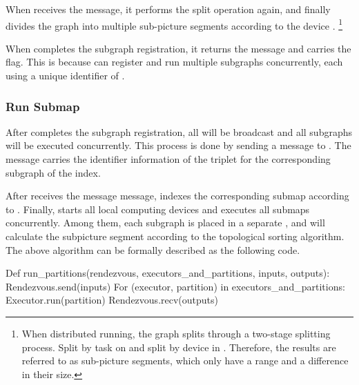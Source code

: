 \begin{content}
When  receives the  message, it performs the split operation again, and finally divides the graph into multiple sub-picture segments  according to the device . \footnote{When distributed running, the graph splits through a two-stage splitting process. Split by task on  and split by device in . Therefore, the results are referred to as sub-picture segments, which only have a range and a difference in their size. }

When  completes the subgraph registration, it returns the  message and carries the  flag. This is because  can register and run multiple subgraphs concurrently, each using a unique identifier of .

\subsubsection{Run Submap}

After  completes the subgraph registration, all  will be broadcast and all subgraphs will be executed concurrently. This process is done by  sending a  message to . The message carries the identifier information of the  triplet for the corresponding subgraph of the  index.

After  receives the message  message,  indexes the corresponding submap according to . Finally,  starts all local computing devices and executes all submaps concurrently. Among them, each subgraph is placed in a separate , and  will calculate the subpicture segment according to the topological sorting algorithm. The above algorithm can be formally described as the following code.


\begin{leftbar}
  \begin{python}
Def run_partitions(rendezvous, executors_and_partitions, inputs, outputs):
  Rendezvous.send(inputs)
  For (executor, partition) in executors_and_partitions: 
    Executor.run(partition)
  Rendezvous.recv(outputs)
  \end{python}
\end{leftbar}


\end{content}
